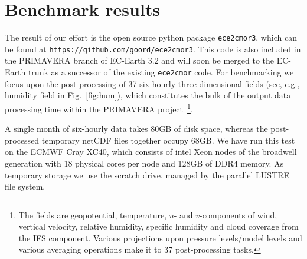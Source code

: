 \documentclass[procedia]{easychair}
\begin{document}
\section{Benchmark results}
The result of our effort is the open source python package \texttt{ece2cmor3}, 
which can be found at \texttt{https://github.com/goord/ece2cmor3}. This code is 
also included in the PRIMAVERA branch of EC-Earth 3.2 and will soon be merged 
to the EC-Earth trunk as a successor of the existing \texttt{ece2cmor} code. 
For benchmarking we focus upon the post-processing of 37 six-hourly 
three-dimensional fields (see, e.g., humidity field in Fig.~\ref{fig:hum}), which constitutes the bulk of the output data 
processing time within the PRIMAVERA project~\footnote{The fields are geopotential, temperature, 
  $u$- and $v$-components of wind, vertical velocity, relative humidity, 
  specific humidity and cloud coverage from the IFS component. 
  Various projections upon pressure levels/model levels and various 
  averaging operations make it to 37 post-processing tasks.}.
  
  A single month of 
six-hourly data takes 80GB of disk space, whereas the post-processed temporary  
netCDF files together occupy 68GB. We have run this test on the ECMWF Cray XC40, 
which consists of intel Xeon nodes of the broadwell generation with 18 physical 
cores per node and 128GB of DDR4 memory. As temporary storage we use the scratch 
drive, managed by the parallel LUSTRE file system.
\end{document}
